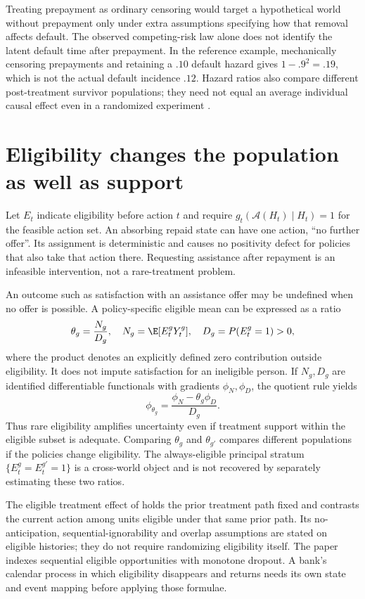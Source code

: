 Treating prepayment as ordinary censoring would target a hypothetical
world without prepayment only under extra assumptions specifying how
that removal affects default. The observed competing-risk law alone
does not identify the latent default time after prepayment. In the
reference example, mechanically censoring prepayments and retaining
a $.10$ default hazard gives $1-.9^2=.19$, which is not the actual
default incidence $.12$. Hazard ratios also compare different
post-treatment survivor populations; they need not equal an average
individual causal effect even in a randomized experiment
\citep[Technical Point 8.1 and Section 17.2]{hernan2020}.



\section{Eligibility changes the population as well as support}
\label{r3:eligibility}
Let $E_t$ indicate eligibility before action $t$ and require
$g_t(\mathcal A(H_t)\mid H_t)=1$ for the feasible action set.
An absorbing repaid state can have one action, ``no further offer''.
Its assignment is deterministic and causes no positivity defect for
policies that also take that action there. Requesting assistance after
repayment is an infeasible intervention, not a rare-treatment problem.

An outcome such as satisfaction with an assistance offer may be
undefined when no offer is possible. A policy-specific eligible mean
can be expressed as a ratio
\[
 \theta_g=\frac{N_g}{D_g},\quad
 N_g=\E[E_t^gY_t^g],\quad D_g=P(E_t^g=1)>0,
\]
where the product denotes an explicitly defined zero contribution
outside eligibility. It does not impute satisfaction for an ineligible
person. If $N_g,D_g$ are identified differentiable functionals with
gradients $\phi_N,\phi_D$, the quotient rule yields
\[
 \phi_{\theta_g}=\frac{\phi_N-\theta_g\phi_D}{D_g}.
\]
Thus rare eligibility amplifies uncertainty even if treatment support
within the eligible subset is adequate. Comparing $\theta_g$ and
$\theta_{g'}$ compares different populations if the policies change
eligibility. The always-eligible principal stratum
$\{E_t^g=E_t^{g'}=1\}$ is a cross-world object and is not recovered
by separately estimating these two ratios.

The eligible treatment effect of \citet[Section 2.2, equation (1)]{selective2025}
holds the prior treatment path fixed and contrasts the current action
among units eligible under that same prior path. Its no-anticipation,
sequential-ignorability and overlap assumptions are stated on eligible
histories; they do not require randomizing eligibility itself. The
paper indexes sequential eligible opportunities with monotone dropout.
A bank's calendar process in which eligibility disappears and returns
needs its own state and event mapping before applying those formulae.

